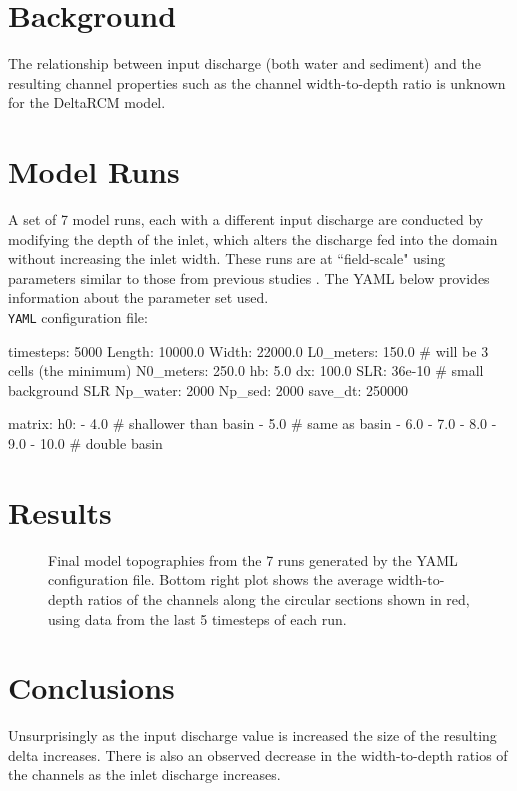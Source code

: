 \section{Background}
The relationship between input discharge (both water and sediment) and the resulting channel properties such as the channel width-to-depth ratio is unknown for the DeltaRCM model. 

\section{Model Runs}
A set of 7 model runs, each with a different input discharge are conducted by modifying the depth of the inlet, which alters the discharge fed into the domain without increasing the inlet width.
These runs are at ``field-scale" using parameters similar to those from previous studies \cite{Liang2016, Liang2016a}.
The YAML below provides information about the parameter set used.\\

\noindent \texttt{YAML} configuration file: \vspace{-6pt}
\begin{boxedverbatim}
timesteps: 5000
Length: 10000.0
Width: 22000.0
L0_meters: 150.0  # will be 3 cells (the minimum)
N0_meters: 250.0
hb: 5.0
dx: 100.0
SLR: 36e-10  # small background SLR
Np_water: 2000
Np_sed: 2000
save_dt: 250000

matrix:
  h0:
    - 4.0  # shallower than basin
    - 5.0  # same as basin
    - 6.0
    - 7.0
    - 8.0
    - 9.0
    - 10.0  # double basin
\end{boxedverbatim}

\section{Results}

\begin{figure}[!ht]
	\caption{Final model topographies from the 7 runs generated by the YAML configuration file. Bottom right plot shows the average width-to-depth ratios of the channels along the circular sections shown in red, using data from the last 5 timesteps of each run.}
	\label{fig:QWD_plot}
\end{figure}

\section{Conclusions}
Unsurprisingly as the input discharge value is increased the size of the resulting delta increases. There is also an observed decrease in the width-to-depth ratios of the channels as the inlet discharge increases. 


